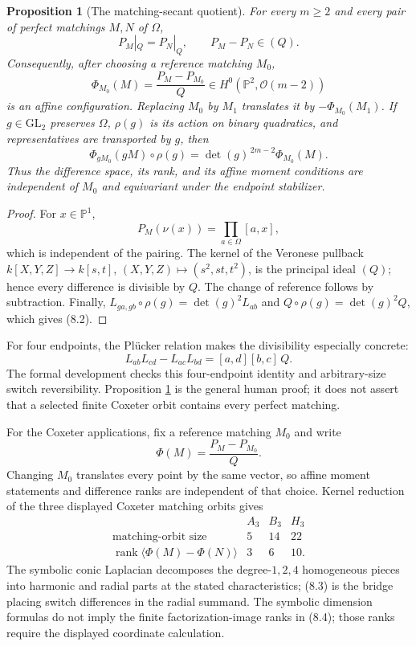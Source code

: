 \documentclass[11pt]{article}
\newtheorem{proposition}[theorem]{Proposition}
\theoremstyle{definition}
\theoremstyle{remark}
\begin{document}
\begin{proposition}[The matching-secant quotient]
\label{prop:general-matching-quotient}
For every $m\ge2$ and every pair of perfect matchings $M,N$ of $\Omega$,
\[
 P_M|_Q=P_N|_Q,\qquad P_M-P_N\in(Q).
\]
Consequently, after choosing a reference matching $M_0$,
\[
 \Phi_{M_0}(M)=\frac{P_M-P_{M_0}}{Q}
       \in H^0(\mathbb P^2,\mathcal O(m-2))                 \tag{8.1}
\]
is an affine configuration.  Replacing $M_0$ by $M_1$ translates it by
$-\Phi_{M_0}(M_1)$.  If $g\in\mathrm{GL}_2$ preserves $\Omega$,
$\rho(g)$ is its action on binary quadratics, and representatives are
transported by $g$, then
\[
 \Phi_{gM_0}(gM)\circ\rho(g)
   =\det(g)^{\,2m-2}\Phi_{M_0}(M).                          \tag{8.2}
\]
Thus the difference space, its rank, and its affine moment conditions are
independent of $M_0$ and equivariant under the endpoint stabilizer.
\end{proposition}

\begin{proof}
For $x\in\mathbb P^1$,
\[
 P_M(\nu(x))=\prod_{a\in\Omega}[a,x],
\]
which is independent of the pairing.  The kernel of the Veronese pullback
$k[X,Y,Z]\to k[s,t]$, $(X,Y,Z)\mapsto(s^2,st,t^2)$, is the principal
ideal $(Q)$; hence every difference is divisible by $Q$.  The change of
reference follows by subtraction.  Finally,
$L_{ga,gb}\circ\rho(g)=\det(g)^2L_{ab}$ and
$Q\circ\rho(g)=\det(g)^2Q$, which gives (8.2).
\end{proof}

For four endpoints, the Pl\"ucker relation makes the divisibility
especially concrete:
\[
 L_{ab}L_{cd}-L_{ac}L_{bd}
   =[a,d][b,c]\,Q.                                      \tag{8.3}
\]
The formal development checks this four-endpoint identity and
arbitrary-size switch reversibility.  Proposition
\ref{prop:general-matching-quotient} is the general human proof; it does
not assert that a selected finite Coxeter orbit contains every perfect
matching.

For the Coxeter applications, fix a reference matching $M_0$ and write
\[
 \Phi(M)=\frac{P_M-P_{M_0}}{Q}.
\]
Changing $M_0$ translates every point by the same vector, so affine moment
statements and difference ranks are independent of that choice.  Kernel
reduction of the three displayed Coxeter matching orbits gives
\[
\begin{array}{c|ccc}
 &A_3&B_3&H_3\\ \hline
\text{matching-orbit size}&5&14&22\\
\operatorname{rank}\langle\Phi(M)-\Phi(N)\rangle&3&6&10.
\end{array}                                             \tag{8.4}
\]
The symbolic conic Laplacian decomposes the degree-$1,2,4$ homogeneous
pieces into harmonic and radial parts at the stated characteristics; (8.3)
is the bridge placing switch differences in the radial summand.  The
symbolic dimension formulas do not imply the finite factorization-image
ranks in (8.4); those ranks require the displayed coordinate calculation.
\end{document}
